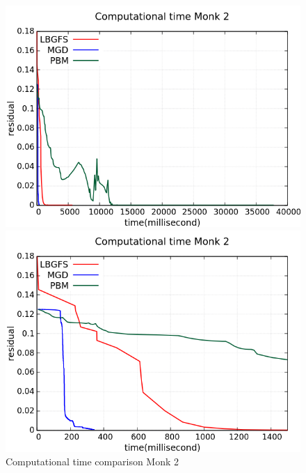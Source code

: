 \begin{figure}[H]
	\centering
	\begin{minipage}[t]{0.5\linewidth}
		\includegraphics[width=\linewidth]{data/Comparison/Monk2/Monk2_CT_Comparison_standard.png}
	\end{minipage}%
	\begin{minipage}[t]{0.5\linewidth}
		\includegraphics[width=\linewidth]{data/Comparison/Monk2/Monk2_CT_Comparison_zoom.png}
	\end{minipage}
	\caption{Computational time comparison Monk 2}
	\label{CT-Monk2}
\end{figure}
